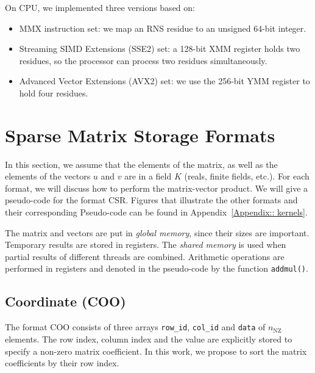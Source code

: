 \documentclass[runningheads,orivec]{llncs}
\begin{document}
On CPU, we implemented three versions based on:
\vspace*{-0.25cm}
\begin{itemize}
\item MMX instruction set: we map an RNS residue to an unsigned 64-bit integer.
\item Streaming SIMD Extensions (SSE2) set: a 128-bit XMM register holds two residues, so the processor can process two residues simultaneously.\item Advanced Vector Extensions (AVX2) set: we use the 256-bit YMM register to hold four residues. 
\end{itemize} 

\vspace*{-0.5cm}
\section{Sparse Matrix Storage Formats}

In this section, we assume that the elements of the matrix, as well as the elements of the vectors $u$ and $v$ are in a field $K$ (reals, finite fields, etc.). For each format, we will discuss how to perform the matrix-vector product. We will give a pseudo-code for the format CSR. Figures that illustrate the other formats and their corresponding Pseudo-code can be found in Appendix~\ref{Appendix:: kernels}.

The matrix and vectors are put in \textit{global memory}, since their sizes are important. Temporary results are stored in registers. The \textit{shared memory} is used when partial results of different threads are combined. Arithmetic operations are performed in registers and denoted in the pseudo-code by the function \texttt{addmul()}.


\label{SpM formats}

\vspace*{-0.25cm}
\subsection*{Coordinate (COO)}
\vspace*{-0.25cm}

The format COO consists of three arrays \texttt{row\_id}, \texttt{col\_id} and \texttt{data} of $n_{\mathrm{NZ}}$ elements. The row index, column index and the value are explicitly stored to specify a non-zero matrix coefficient. In this work, we propose to sort the matrix coefficients by their row index.
\end{document}
